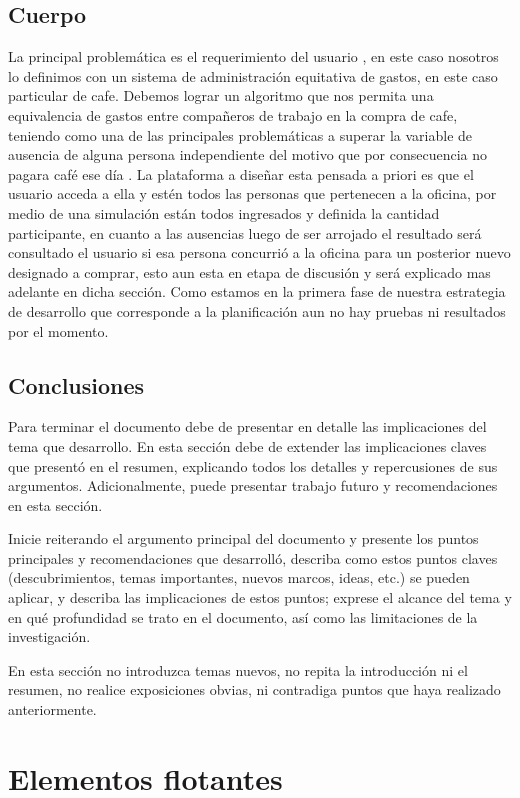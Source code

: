 \documentclass[twocolumn,11pts]{IEEEtran}
\begin{document}
\subsection{Cuerpo}
La principal problemática es el requerimiento del usuario , en este caso nosotros lo definimos con un sistema de administración equitativa de gastos, en este caso particular de cafe.
Debemos lograr un algoritmo que nos permita una equivalencia de gastos entre compañeros de trabajo en la compra de cafe, teniendo como una de las principales problemáticas a superar la variable de ausencia de alguna persona independiente del motivo que por consecuencia no pagara café ese día .
La plataforma a diseñar esta pensada a priori es que el usuario acceda a ella y estén todos las personas que pertenecen a la oficina, por medio de una simulación  están todos ingresados y definida la cantidad participante, en cuanto a las ausencias luego de ser arrojado el resultado será consultado el usuario si esa persona concurrió a la oficina para un posterior nuevo designado a comprar, esto aun esta en etapa de discusión y será explicado mas adelante en dicha sección.
Como estamos en la primera fase de nuestra estrategia de desarrollo que corresponde a la planificación aun no hay pruebas ni resultados por el momento.


\subsection{Conclusiones}
Para terminar el documento debe de presentar en detalle las implicaciones del tema que desarrollo. En esta sección debe de extender las implicaciones claves que presentó en el resumen, explicando todos los detalles y repercusiones de sus argumentos. Adicionalmente, puede presentar trabajo futuro y recomendaciones en esta sección.

Inicie reiterando el argumento principal del documento y presente los puntos principales y recomendaciones que desarrolló, describa como estos puntos claves (descubrimientos, temas importantes, nuevos marcos, ideas, etc.) se pueden aplicar, y describa las implicaciones de estos puntos; exprese el alcance del tema y en qué profundidad se trato en el documento, así como las limitaciones de la investigación. 

En esta sección no introduzca temas nuevos, no repita la introducción ni el resumen, no realice exposiciones obvias, ni contradiga puntos que haya realizado anteriormente.

\section{Elementos flotantes}
\end{document}
